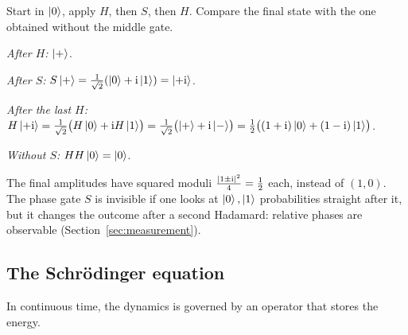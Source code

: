 \begin{example}\label{ex:circuit}
  Start in $\left|0\right\rangle$, apply $H$, then $S$, then $H$. Compare the final state with the one obtained without the middle gate.
\end{example}
\begin{solution}
  \begin{steps}
    \item \emph{After $H$:} $\left|+\right\rangle$.
    \item \emph{After $S$:} $S\left|+\right\rangle=\frac1{\sqrt2}(\left|0\right\rangle+\mathrm{i}\left|1\right\rangle)=\left|+\mathrm{i}\right\rangle$.
    \item \emph{After the last $H$:} $H\left|+\mathrm{i}\right\rangle=\tfrac1{\sqrt2}\bigl(H\left|0\right\rangle+\mathrm{i} H\left|1\right\rangle\bigr)=\tfrac1{\sqrt2}\bigl(\left|+\right\rangle+\mathrm{i}\left|-\right\rangle\bigr)=\tfrac12\bigl((1+\mathrm{i})\left|0\right\rangle+(1-\mathrm{i})\left|1\right\rangle\bigr)$.
    \item \emph{Without $S$:} $HH\left|0\right\rangle=\left|0\right\rangle$.
  \end{steps}
  The final amplitudes have squared moduli $\tfrac{\left|1\pm\mathrm{i}\right|^2}{4}=\tfrac12$ each, instead of $(1,0)$. The phase gate $S$ is invisible if one looks at $\left|0\right\rangle,\left|1\right\rangle$ probabilities straight after it, but it changes the outcome after a second Hadamard: relative phases are observable (Section~\ref{sec:measurement}).
\end{solution}

\subsection{The Schr\"odinger equation}

In continuous time, the dynamics is governed by an operator that stores the energy.

